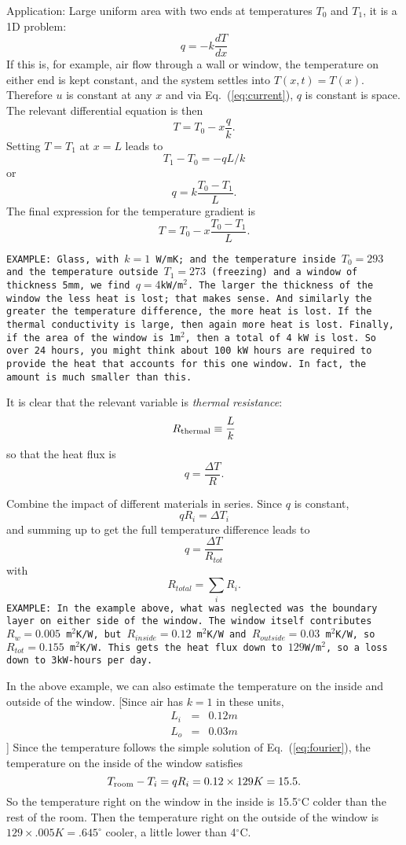 \documentclass[11pt]{book}
\def\be{\begin{equation}}
\def\ee{\end{equation}}
\def\bea{\begin{eqnarray}}
\def\eea{\end{eqnarray}}
\newcommand{\vs}{\nonumber\\}
\newcommand{\ec}[1]{Eq.~(\ref{eq:#1})}
\newcommand{\eql}[1]{\label{eq:#1}}
\newcommand\example[1]{{\tt EXAMPLE: #1}}
\begin{document}
Application: Large uniform area with two ends at temperatures $T_0$ and $T_1$, it is a 1D problem:
\be
q=-k\frac{dT}{dx}
\ee
If this is, for example, air flow through a wall or window, the temperature on either end is kept constant, and the system settles into $T(x,t)=T(x)$. Therefore $u$ is constant at any $x$ and  via \ec{current}, $q$ is constant is space. The relevant differential equation is then
\be
T = T_0 - x\frac{q}{k}
.\ee
Setting $T=T_1$ at $x=L$ leads to
\be
T_1-T_0= -qL/k \eql{fourier}\ee
or
\be
q=k \frac{T_0-T_1}{L}
.\ee
The final expression for the temperature gradient is
\be
T=T_0 - x \frac{T_0-T_1}{L}.\ee

\example{Glass, with $k=1$ W/mK; and the temperature inside $T_0=293$ and the temperature outside $T_1=273$ (freezing) and a window of thickness 5mm, we find $q=4$kW/m$^2$. The larger the thickness of the window the less heat is lost; that makes sense. And similarly the greater the temperature difference, the more heat is lost. If the thermal conductivity is large, then again more heat is lost. Finally, if the area of the window is 1m$^2$, then a total of 4 kW is lost. So over 24 hours, you might think about 100 kW hours are required to provide the heat that accounts for this one window. In fact, the amount is much smaller than this.}

It is clear that the relevant variable is {\it thermal resistance}:
\be
R_{\rm thermal} \equiv \frac{L}{k}
\ee
so that the heat flux is
\be
q = \frac{\Delta T}{R}.\ee

Combine the impact of different materials in series. Since $q$ is constant,
\be
qR_i= \Delta T_i
\ee
and summing up to get the full temperature difference leads to
\be
q=\frac{\Delta T}{R_{tot}}\ee
with
\be
R_{total} = \sum_i R_i
.\ee
\example{In the example above, what was neglected was the boundary layer on either side of the window. The window itself contributes $R_w=0.005$ m$^2$K/W, but $R_{inside}=0.12$ m$^2$K/W and $R_{outside}=0.03$ m$^2$K/W, so $R_{tot}=0.155$ m$^2$K/W. This gets the heat flux down to $129$W/m$^2$, so a loss down to 3kW-hours per day.}

In the above example, we can also estimate the temperature on the inside and outside of the window. [Since air has $k=1$ in these units, 
\bea
L_i &=&0.12 m\vs
L_o &=& 0.03 m
\eea]
Since the temperature follows the simple solution of \ec{fourier}, the temperature on the inside of the window
satisfies
\be
T_{\rm room}-T_i=qR_i = 0.12 \times 129K=15.5
.\ee
So the temperature right on the window in the inside is 15.5$^\circ$C colder than the rest of the room. Then the temperature right on the outside of the window is $129\times .005K=.645^\circ$ cooler, a little lower than 4$^\circ$C.
\end{document}
